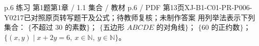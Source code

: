 \par\noindent\begin{minipage}{\linewidth}
\begin{bankitem}{p.6 练习 第1题}{第1章 / 1.1 集合 / 教材 p.6 / PDF 第13页}{XJ-B1-C01-PR-P006-Y0217}{已对照原页转写题干及公式；待教师复核；未制作答案}
用列举法表示下列集合：
$\{\text{不超过 30 的素数}\}$；
$\{\text{五边形 }ABCDE\text{ 的对角线}\}$；
$\{60\text{ 的正约数}\}$；
$\{(x,y)\mid x+2y=6,\ x\in\mathbb N,\ y\in\mathbb N\}$。
\end{bankitem}
\end{minipage}\par\medskip
